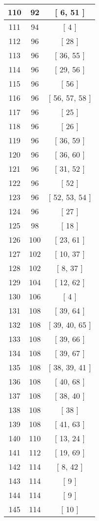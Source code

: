 \begin{center}
\begin{longtable}[H]{|| c c c ||}
\hline
110 & 92 & [ 6, 51 ] \\ 
\hline
111 & 94 & [ 4 ] \\ 
\hline
112 & 96 & [ 28 ] \\ 
\hline
113 & 96 & [ 36, 55 ] \\ 
\hline
114 & 96 & [ 29, 56 ] \\ 
\hline
115 & 96 & [ 56 ] \\ 
\hline
116 & 96 & [ 56, 57, 58 ] \\ 
\hline
117 & 96 & [ 25 ] \\ 
\hline
118 & 96 & [ 26 ] \\ 
\hline
119 & 96 & [ 36, 59 ] \\ 
\hline
120 & 96 & [ 36, 60 ] \\ 
\hline
121 & 96 & [ 31, 52 ] \\ 
\hline
122 & 96 & [ 52 ] \\ 
\hline
123 & 96 & [ 52, 53, 54 ] \\ 
\hline
124 & 96 & [ 27 ] \\ 
\hline
125 & 98 & [ 18 ] \\ 
\hline
126 & 100 & [ 23, 61 ] \\ 
\hline
127 & 102 & [ 10, 37 ] \\ 
\hline
128 & 102 & [ 8, 37 ] \\ 
\hline
129 & 104 & [ 12, 62 ] \\ 
\hline
130 & 106 & [ 4 ] \\ 
\hline
131 & 108 & [ 39, 64 ] \\ 
\hline
132 & 108 & [ 39, 40, 65 ] \\ 
\hline
133 & 108 & [ 39, 66 ] \\ 
\hline
134 & 108 & [ 39, 67 ] \\ 
\hline
135 & 108 & [ 38, 39, 41 ] \\ 
\hline
136 & 108 & [ 40, 68 ] \\ 
\hline
137 & 108 & [ 38, 40 ] \\ 
\hline
138 & 108 & [ 38 ] \\ 
\hline
139 & 108 & [ 41, 63 ] \\ 
\hline
140 & 110 & [ 13, 24 ] \\ 
\hline
141 & 112 & [ 19, 69 ] \\ 
\hline
142 & 114 & [ 8, 42 ] \\ 
\hline
143 & 114 & [ 9 ] \\ 
\hline
144 & 114 & [ 9 ] \\ 
\hline
145 & 114 & [ 10 ] \\ 

\end{longtable}
\end{center}

